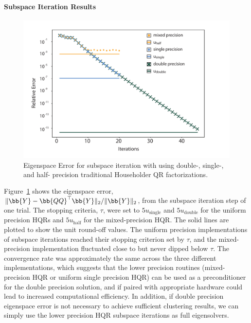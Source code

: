\paragraph{Subspace Iteration Results} 
\begin{figure}
	\centering
	\includegraphics[width=.5\textwidth]{./figures/5000-19subIter.pdf}
	\caption{\label{fig:subIter} Eigenspace Error for subspace iteration with using double-, single-, and half- precision traditional Householder QR factorizations.}
	\vspace{-20pt}	
\end{figure}
Figure~\ref{fig:subIter} shows the eigenspace error, $\|\bb{Y}-\bb{QQ}^{\top}\bb{Y}\|_2/\|\bb{Y}\|_2$, from the subspace iteration step of one trial.
The stopping criteria, $\tau$, were set to $5u_{\text{single}}$ and $5u_{\text{double}}$ for the uniform precision HQRs and $5u_{\text{half}}$ for the mixed-precision HQR.
The solid lines are plotted to show the unit round-off values. 
The uniform precision implementations of subspace iterations reached their stopping criterion set by $\tau$, and the mixed-precision implementation fluctuated close to but never dipped below $\tau$. 
The convergence rate was approximately the same across the three different implementations, which suggests that the lower precision routines (mixed-precision HQR or uniform single precision HQR) can be used as a preconditioner for the double precision solution, and if paired with appropriate hardware could lead to increased computational efficiency.
In addition, if double precision eigenspace error is not necessary to achieve sufficient clustering results, we can simply use the lower precision HQR subspace iterations as full eigensolvers. 

